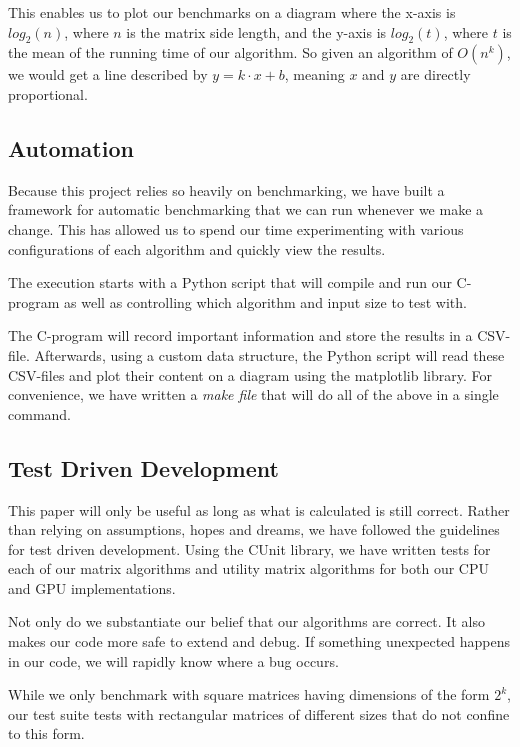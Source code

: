 This enables us to plot our benchmarks on a diagram where the x-axis is $log_2(n)$, where $n$ is the matrix side length, and the y-axis is $log_2(t)$, where $t$ is the mean of the running time of our algorithm. So given an algorithm of $O(n^k)$, we would get a line described by $y = k \cdot x + b$, meaning $x$ and $y$ are directly proportional. 

\subsection{Automation}
Because this project relies so heavily on benchmarking, we have built a framework for automatic benchmarking that we can run whenever we make a change. This has allowed us to spend our time experimenting with various configurations of each algorithm and quickly view the results. 

The execution starts with a Python script that will compile and run our C-program as well as controlling which algorithm and input size to test with. 

The C-program will record important information and store the results in a CSV-file. Afterwards, using a custom data structure, the Python script will read these CSV-files and plot their content on a diagram using the matplotlib library\cite{matplotlib}. For convenience, we have written a \textit{make file} that will do all of the above in a single command. 

\subsection{Test Driven Development}
This paper will only be useful as long as what is calculated is still correct. Rather than relying on assumptions, hopes and dreams, we have followed the guidelines for test driven development. Using the CUnit library\cite{cUnit}, we have written tests for each of our matrix algorithms and utility matrix algorithms for both our CPU and GPU implementations. 

Not only do we substantiate our belief that our algorithms are correct. It also makes our code more safe to extend and debug. If something unexpected happens in our code, we will rapidly know where a bug occurs.

While we only benchmark with square matrices having dimensions of the form $2^k$, our test suite tests with rectangular matrices of different sizes that do not confine to this form.